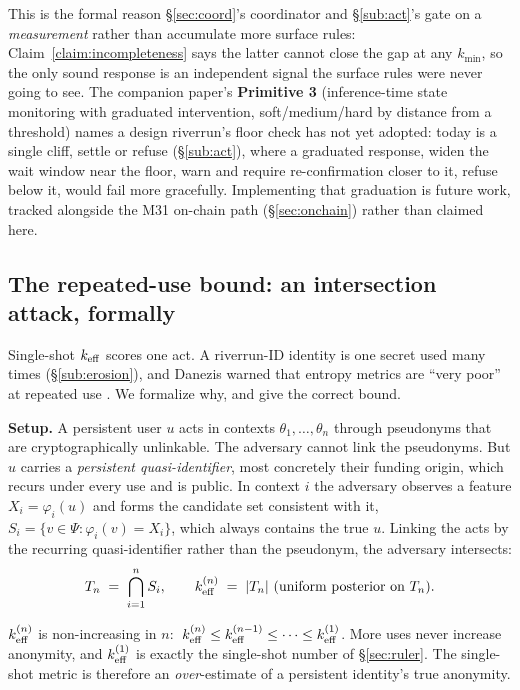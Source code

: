 \documentclass[11pt]{article}
\begin{document}
This is the formal reason \S\ref{sec:coord}'s coordinator and \S\ref{sub:act}'s 
gate on a \emph{measurement} rather than accumulate more surface rules: Claim~\ref{claim:incompleteness}
says the latter cannot close the gap at any $k_{\min}$, so the only sound response is an
independent signal the surface rules were never going to see. The companion paper's
\textbf{Primitive 3} (inference-time state monitoring with graduated intervention,
soft/medium/hard by distance from a threshold) names a design riverrun's floor check has
not yet adopted: today  is a single cliff, settle or refuse
(\S\ref{sub:act}), where a graduated response, widen the wait window near the floor, warn
and require re-confirmation closer to it, refuse below it, would fail more gracefully.
Implementing that graduation is future work, tracked alongside the M31 on-chain path
(\S\ref{sec:onchain}) rather than claimed here.

\subsection{The repeated-use bound: an intersection attack, formally}

Single-shot $k_{\mathrm{eff}}$ scores one act. A riverrun-ID identity is one secret used many times
(\S\ref{sub:erosion}), and Danezis warned that entropy metrics are ``very poor'' at
repeated use \cite{danezismeasure}. We formalize why, and give the correct bound.

\textbf{Setup.} A persistent user $u$ acts in contexts $\theta_1, \dots, \theta_n$
through pseudonyms that are cryptographically unlinkable. The adversary cannot link the
pseudonyms. But $u$ carries a \emph{persistent quasi-identifier}, most concretely their
funding origin, which recurs under every use and is public. In context $i$ the adversary
observes a feature $X_i = \varphi_i(u)$ and forms the candidate set consistent with it,
$S_i = \{v \in \Psi : \varphi_i(v) = X_i\}$, which always contains the true $u$. Linking
the acts by the recurring quasi-identifier rather than the pseudonym, the adversary
intersects:
\[ T_n \;=\; \bigcap_{i=1}^{n} S_i, \qquad k_{\mathrm{eff}}^{(n)} \;=\; |T_n|
\text{ (uniform posterior on } T_n\text{)}. \]

\begin{property}
$k_{\mathrm{eff}}^{(n)}$ is non-increasing in $n$: $\;k_{\mathrm{eff}}^{(n)} \le k_{\mathrm{eff}}^{(n-1)} \le \dots \le
k_{\mathrm{eff}}^{(1)}$. More uses never increase anonymity, and $k_{\mathrm{eff}}^{(1)}$ is exactly the
single-shot number of \S\ref{sec:ruler}. The single-shot metric is therefore an
\emph{over}-estimate of a persistent identity's true anonymity.
\end{property}
\end{document}
